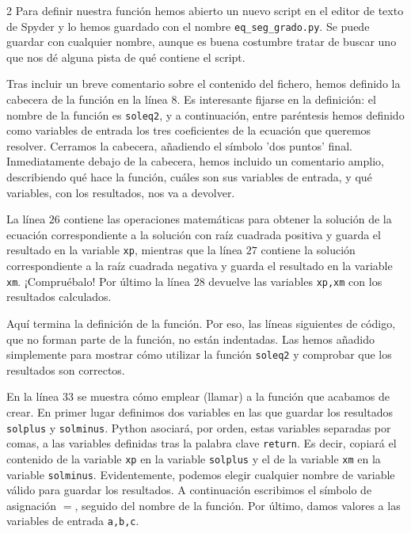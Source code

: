 \begin{paracol}{2}
    Para definir nuestra función hemos abierto un nuevo script en el editor de texto de Spyder y lo hemos guardado con el nombre \texttt{eq\_seg\_grado.py}. Se puede guardar con cualquier nombre, aunque es buena costumbre tratar de buscar uno que nos dé alguna pista de qué contiene el script.

    Tras incluir un breve comentario sobre el contenido del fichero, hemos definido la cabecera de la función en la línea $8$. Es interesante fijarse en la definición: el nombre de la función es \texttt{soleq2}, y a continuación, entre paréntesis hemos definido como variables de entrada los tres coeficientes de la ecuación que queremos resolver. Cerramos la cabecera, añadiendo el símbolo 'dos puntos' final. Inmediatamente debajo de la cabecera, hemos incluido un comentario amplio, describiendo qué hace la función, cuáles son sus variables de entrada, y qué variables, con los resultados, nos va a devolver.

    La línea $26$ contiene las operaciones matemáticas para obtener la solución de la ecuación correspondiente a la solución con raíz cuadrada positiva y guarda el resultado en la variable \texttt{xp}, mientras que la línea $27$ contiene la solución  correspondiente a la raíz cuadrada negativa y guarda el resultado en la variable \texttt{xm}. ¡Compruébalo!
    Por último la línea $28$ devuelve las variables \texttt{xp,xm} con los resultados calculados.

    Aquí termina la definición de la función. Por eso, las líneas siguientes de código, que no forman parte de la función, no están indentadas. Las hemos añadido simplemente para mostrar cómo utilizar la función \texttt{soleq2} y comprobar que los resultados son correctos.

    En la línea $33$ se muestra cómo emplear (llamar) a la función que acabamos de crear. En primer lugar definimos dos variables en las que guardar los resultados \texttt{solplus} y \texttt{solminus}. Python asociará, por orden, estas variables separadas por comas, a las variables definidas tras la palabra clave \texttt{return}. Es decir, copiará el contenido de la variable \texttt{xp} en la variable \texttt{solplus} y el de la variable \texttt{xm} en la variable \texttt{solminus}. Evidentemente, podemos elegir cualquier nombre de variable válido para guardar los resultados. A continuación escribimos el símbolo de asignación $=$, seguido del nombre de la función. Por último, damos valores a las variables de entrada \texttt{a,b,c}.


\end{paracol}
